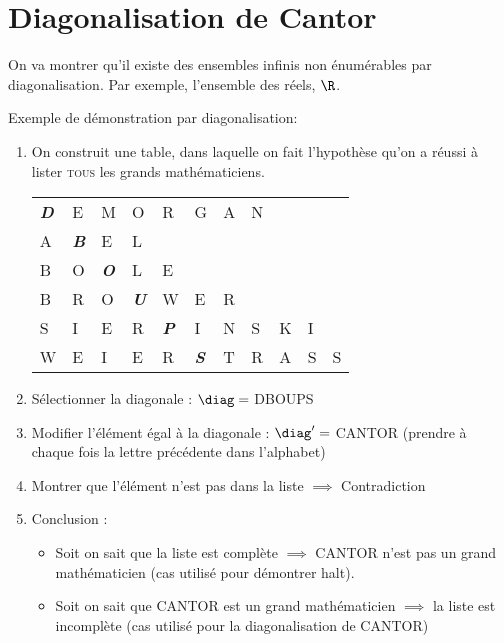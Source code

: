 \section{Diagonalisation de Cantor}
\label{sec:cantor}
On va montrer qu'il existe des ensembles infinis non énumérables par diagonalisation. Par exemple, l'ensemble des réels, $\R$.
\begin{myexem}
	Exemple de démonstration par diagonalisation:
	\begin{enumerate}
		\item On construit une table, dans laquelle on fait l'hypothèse qu'on a réussi à lister \textsc{tous} les grands mathématiciens.\\
			\begin{tabular}{lllllllllll}
				\emph{\textbf{D}}&E& M&O&R&G&A&N&&& \\
				A&\emph{\textbf{B}}&E&L&&&&&&&\\
				B&O&\emph{\textbf{O}}&L&E&&&&&&\\
				B&R&O&\emph{\textbf{U}}&W&E&R&&&&\\
				S&I&E&R&\emph{\textbf{P}}&I&N&S&K&I&\\
				W&E&I&E&R&\emph{\textbf{S}}&T&R&A&S&S\\
			\end{tabular}
		\item Sélectionner la diagonale : $\diag = $ DBOUPS
		\item Modifier l'élément égal à la diagonale : $\diag' =$ CANTOR (prendre à chaque fois la lettre précédente dans l'alphabet)
		\item Montrer que l'élément n'est pas dans la liste $\implies$ Contradiction
		\item Conclusion :
			\begin{itemize}
				\item Soit on sait que la liste est complète
					\subitem $ \implies$ CANTOR n'est pas un grand
					mathématicien (cas utilisé pour démontrer halt).
				\item Soit on sait que CANTOR est un grand
					mathématicien
					\subitem $ \implies$ la liste est incomplète (cas utilisé pour la diagonalisation de CANTOR)
			\end{itemize}
	\end{enumerate}
\end{myexem}

